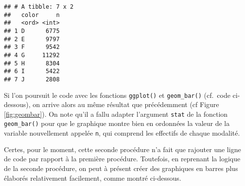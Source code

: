\documentclass[
  french,
]{book}
\newenvironment{Shaded}{\begin{snugshade}}{\end{snugshade}}
\newcommand{\DataTypeTok}[1]{\textcolor[rgb]{0.13,0.29,0.53}{#1}}
\newcommand{\KeywordTok}[1]{\textcolor[rgb]{0.13,0.29,0.53}{\textbf{#1}}}
\newcommand{\NormalTok}[1]{#1}
\newcommand{\OperatorTok}[1]{\textcolor[rgb]{0.81,0.36,0.00}{\textbf{#1}}}
\newcommand{\StringTok}[1]{\textcolor[rgb]{0.31,0.60,0.02}{#1}}
\begin{document}
\begin{Shaded}
\end{Shaded}

\begin{verbatim}
## # A tibble: 7 x 2
##   color     n
##   <ord> <int>
## 1 D      6775
## 2 E      9797
## 3 F      9542
## 4 G     11292
## 5 H      8304
## 6 I      5422
## 7 J      2808
\end{verbatim}

Si l'on poursuit le code avec les fonctions \texttt{ggplot()} et \texttt{geom\_bar()} (cf.~code ci-dessous), on arrive alors au même résultat que précédemment (cf Figure \ref{fig:geombar}). On note qu'il a fallu adapter l'argument \texttt{stat} de la fonction \texttt{geom\_bar()} pour que le graphique montre bien en ordonnées la valeur de la variable nouvellement appelée \texttt{n}, qui comprend les effectifs de chaque modalité.

\begin{Shaded}
\end{Shaded}

Certes, pour le moment, cette seconde procédure n'a fait que rajouter une ligne de code par rapport à la première procédure. Toutefois, en reprenant la logique de la seconde procédure, on peut à présent créer des graphiques en barres plus élaborés relativement facilement, comme montré ci-dessous.
\end{document}
